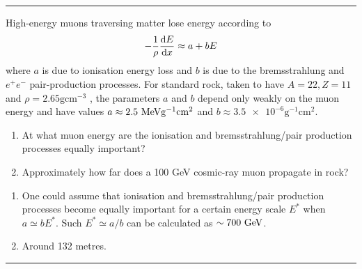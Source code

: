 \noindent\rule{7in}{1.5pt}


\begin{problem}{1.7}
High-energy muons traversing matter lose energy according to
\begin{align*}
    -\frac{1}{\rho} \frac{\mathop{}\!\mathrm{d} E}{\mathop{}\!\mathrm{d} x} \approx a + bE 
\end{align*}
where $a$ is due to ionisation energy loss and $b$ is due to the bremsstrahlung and $e^+e^-$ pair-production processes. 
For standard rock, taken to have $A = 22, Z = 11$ and $\rho = 2.65 \unit{\gram\centi\metre^{-3}}$ , the parameters $a$ and $b$ depend only weakly on 
the muon energy and have values $a \approx 2.5 \MeV\unit{\gram^{-1}\centi\metre^2}$ and $b \approx \num{3.5e-6} \unit{\gram^{-1}\centi\metre^2}$.
\begin{enumerate}[label=(\alph*)]
    \item At what muon energy are the ionisation and bremsstrahlung/pair production processes equally important?
    \item Approximately how far does a 100 GeV cosmic-ray muon propagate in rock?
\end{enumerate}
\end{problem}
\begin{solution}
\begin{enumerate}[label=(\alph*)]
    \item One could assume that ionisation and bremsstrahlung/pair production processes become equally important for a certain energy scale $E^\ast$ when $a \simeq bE^\ast$.
    Such $E^\ast \simeq a/b$ can be calculated as $\sim 700 \text{ GeV}$.
    \item Around 132 metres. 
\end{enumerate}
\end{solution}

\noindent\rule{7in}{1.5pt}

